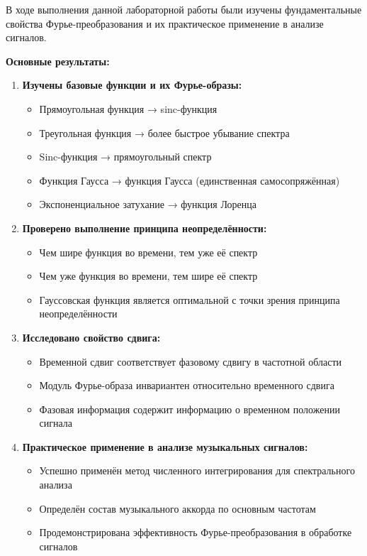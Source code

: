 В ходе выполнения данной лабораторной работы были изучены фундаментальные свойства Фурье-преобразования и их практическое применение в анализе сигналов.

\textbf{Основные результаты:}

\begin{enumerate}
    \item \textbf{Изучены базовые функции и их Фурье-образы:}
    \begin{itemize}
        \item Прямоугольная функция → sinc-функция
        \item Треугольная функция → более быстрое убывание спектра
        \item Sinc-функция → прямоугольный спектр
        \item Функция Гаусса → функция Гаусса (единственная самосопряжённая)
        \item Экспоненциальное затухание → функция Лоренца
    \end{itemize}
    
    \item \textbf{Проверено выполнение принципа неопределённости:}
    \begin{itemize}
        \item Чем шире функция во времени, тем уже её спектр
        \item Чем уже функция во времени, тем шире её спектр
        \item Гауссовская функция является оптимальной с точки зрения принципа неопределённости
    \end{itemize}
    
    \item \textbf{Исследовано свойство сдвига:}
    \begin{itemize}
        \item Временной сдвиг соответствует фазовому сдвигу в частотной области
        \item Модуль Фурье-образа инвариантен относительно временного сдвига
        \item Фазовая информация содержит информацию о временном положении сигнала
    \end{itemize}
    
    \item \textbf{Практическое применение в анализе музыкальных сигналов:}
    \begin{itemize}
        \item Успешно применён метод численного интегрирования для спектрального анализа
        \item Определён состав музыкального аккорда по основным частотам
        \item Продемонстрирована эффективность Фурье-преобразования в обработке сигналов
    \end{itemize}
\end{enumerate}

